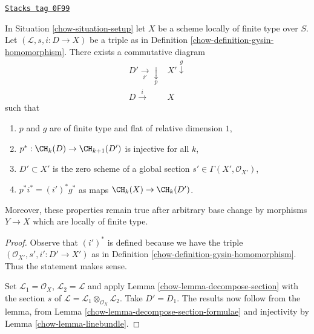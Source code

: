 \begin{lemma}
\label{chow-lemma-normal-cone-effective-Cartier}
\href{https://stacks.math.columbia.edu/tag/0F99}{\texttt{Stacks tag 0F99}}

In Situation \ref{chow-situation-setup} let $X$ be a scheme locally
of finite type over $S$. Let $(\mathcal{L}, s, i : D \to X)$
be a triple as in Definition \ref{chow-definition-gysin-homomorphism}.
There exists a commutative diagram
$$
\begin{array}{cc}D' \underset{i'}{\longrightarrow}\underset{p}{\downarrow} & X' \overset{g}{\downarrow} \\ D \overset{i}{\longrightarrow} & X\end{array}
$$
such that
\begin{enumerate}
\item $p$ and $g$ are of finite type and flat of relative dimension $1$,
\item $p^* : \CH_k(D) \to \CH_{k + 1}(D')$ is injective for all $k$,
\item $D' \subset X'$ is the zero scheme of a global section
$s' \in \Gamma(X', \mathcal{O}_{X'})$,
\item $p^*i^* = (i')^*g^*$ as maps $\CH_k(X) \to \CH_k(D')$.
\end{enumerate}
Moreover, these properties remain true after arbitrary base change
by morphisms $Y \to X$ which are locally of finite type.
\end{lemma}

\begin{proof}

Observe that $(i')^*$ is defined because we have the triple
$(\mathcal{O}_{X'}, s', i' : D' \to X')$ as in
Definition \ref{chow-definition-gysin-homomorphism}. Thus the statement makes sense.

\medskip\noindent
Set $\mathcal{L}_1 = \mathcal{O}_X$, $\mathcal{L}_2 = \mathcal{L}$
and apply Lemma \ref{chow-lemma-decompose-section} with the section $s$ of
$\mathcal{L} = \mathcal{L}_1 \otimes_{\mathcal{O}_X} \mathcal{L}_2$.
Take $D' = D_1$. The results now follow from the lemma, from
Lemma \ref{chow-lemma-decompose-section-formulae}
and injectivity by
Lemma \ref{chow-lemma-linebundle}.
\end{proof}

